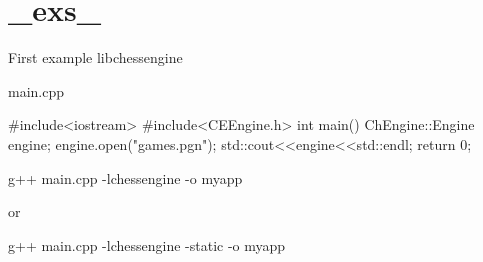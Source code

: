\hypertarget{_exs_-example}{
\section{\_\-exs\_\-}
}
First example libchessengine


\begin{DoxyCode}
 main.cpp

#include<iostream>
#include<CEEngine.h>
int main()
{
    ChEngine::Engine engine;
    engine.open("games.pgn");
    std::cout<<engine<<std::endl;
    return 0;
}
\end{DoxyCode}


g++ main.cpp -\/lchessengine -\/o myapp

or

g++ main.cpp -\/lchessengine -\/static -\/o myapp


\begin{DoxyCodeInclude}
\end{DoxyCodeInclude}
 